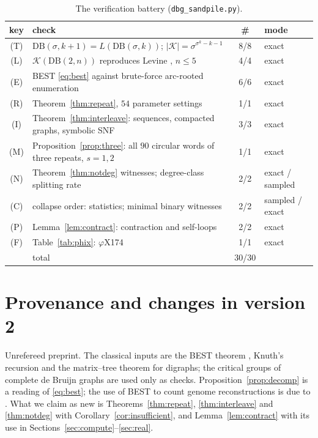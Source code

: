 \documentclass[11pt]{article}
\theoremstyle{plain}
\theoremstyle{definition}
\theoremstyle{remark}
\newcommand{\K}{\mathcal{K}}
\newcommand{\DB}{\mathrm{DB}}
\begin{document}
\begin{table}[ht]
\centering\small
\begin{tabular}{clcl}
\toprule
key & check & \# & mode\\
\midrule
(T) & $\DB(\sigma,k{+}1)=L(\DB(\sigma,k))$; $|\K|=\sigma^{\sigma^{k}-k-1}$ & 8/8 & exact\\
(L) & $\K(\DB(2,n))$ reproduces Levine \cite{Levine}, $n\le5$ & 4/4 & exact\\
(E) & BEST \eqref{eq:best} against brute-force arc-rooted enumeration & 6/6 & exact\\
(R) & Theorem~\ref{thm:repeat}, $54$ parameter settings & 1/1 & exact\\
(I) & Theorem~\ref{thm:interleave}: sequences, compacted graphs, symbolic SNF & 3/3 & exact\\
(M) & Proposition~\ref{prop:three}: all $90$ circular words of three repeats, $s=1,2$ & 1/1 & exact\\
(N) & Theorem~\ref{thm:notdeg} witnesses; degree-class splitting rate & 2/2 & exact / sampled\\
(C) & collapse order: statistics; minimal binary witnesses & 2/2 & sampled / exact\\
(P) & Lemma~\ref{lem:contract}: contraction and self-loops & 2/2 & exact\\
(F) & Table~\ref{tab:phix}: $\varphi$X174 & 1/1 & exact\\
\midrule
 & total & 30/30 & \\
\bottomrule
\end{tabular}
\caption{The verification battery (\texttt{dbg\_sandpile.py}).}
\label{tab:battery}
\end{table}

\section*{Provenance and changes in version 2}

Unrefereed preprint. The classical inputs are the BEST theorem \cite{AEdB,SmithTutte},
Knuth's recursion \cite{Knuth} and the matrix--tree theorem for digraphs; the critical
groups of complete de Bruijn graphs \cite{Levine,BidkhoriKishore,CHP} are used only as
checks. Proposition~\ref{prop:decomp} is a reading of \eqref{eq:best}; the use of BEST to
count genome reconstructions is due to \cite{KSP}. What we claim as new is
Theorems~\ref{thm:repeat}, \ref{thm:interleave} and \ref{thm:notdeg} with
Corollary~\ref{cor:insufficient}, and Lemma~\ref{lem:contract} with its use in
Sections~\ref{sec:compute}--\ref{sec:real}.
\end{document}
